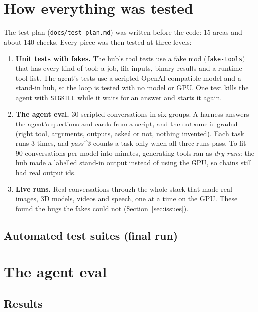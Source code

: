 \documentclass[10.5pt,a4paper]{article}
\newcommand{\code}[1]{\texttt{\small #1}}
\begin{document}
\section{How everything was tested}
The test plan (\code{docs/test-plan.md}) was written before the code: 15 areas and about 140 checks. Every piece was then tested at three levels:
\begin{enumerate}[leftmargin=*]
\item \textbf{Unit tests with fakes.} The hub's tool tests use a fake mod (\code{fake-tools}) that has every kind of tool: a job, file inputs, binary results and a runtime tool list. The agent's tests use a scripted OpenAI-compatible model and a stand-in hub, so the loop is tested with no model or GPU. One test kills the agent with \code{SIGKILL} while it waits for an answer and starts it again.
\item \textbf{The agent eval.} 30 scripted conversations in six groups. A harness answers the agent's questions and cards from a script, and the outcome is graded (right tool, arguments, outputs, asked or not, nothing invented). Each task runs 3 times, and \emph{pass\textasciicircum{}3} counts a task only when all three runs pass. To fit 90 conversations per model into minutes, generating tools ran as \emph{dry runs}: the hub made a labelled stand-in output instead of using the GPU, so chains still had real output ids.
\item \textbf{Live runs.} Real conversations through the whole stack that made real images, 3D models, videos and speech, one at a time on the GPU. These found the bugs the fakes could not (Section~\ref{sec:issues}).
\end{enumerate}

\subsection{Automated test suites (final run)}


\section{The agent eval}
\subsection{Results}

\end{document}
